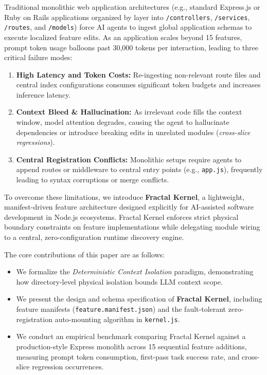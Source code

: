\documentclass[conference]{IEEEtran}
\begin{document}
Traditional monolithic web application architectures (e.g., standard Express.js or Ruby on Rails applications organized by layer into \texttt{/controllers}, \texttt{/services}, \texttt{/routes}, and \texttt{/models}) force AI agents to ingest global application schemas to execute localized feature edits. As an application scales beyond 15 features, prompt token usage balloons past 30,000 tokens per interaction, leading to three critical failure modes:
\begin{enumerate}
    \item \textbf{High Latency and Token Costs:} Re-ingesting non-relevant route files and central index configurations consumes significant token budgets and increases inference latency.
    \item \textbf{Context Bleed \& Hallucination:} As irrelevant code fills the context window, model attention degrades, causing the agent to hallucinate dependencies or introduce breaking edits in unrelated modules (\textit{cross-slice regressions}).
    \item \textbf{Central Registration Conflicts:} Monolithic setups require agents to append routes or middleware to central entry points (e.g., \texttt{app.js}), frequently leading to syntax corruptions or merge conflicts.
\end{enumerate}

To overcome these limitations, we introduce \textbf{Fractal Kernel}, a lightweight, manifest-driven feature architecture designed explicitly for AI-assisted software development in Node.js ecosystems. Fractal Kernel enforces strict physical boundary constraints on feature implementations while delegating module wiring to a central, zero-configuration runtime discovery engine.

The core contributions of this paper are as follows:
\begin{itemize}
    \item We formalize the \textit{Deterministic Context Isolation} paradigm, demonstrating how directory-level physical isolation bounds LLM context scope.
    \item We present the design and schema specification of \textbf{Fractal Kernel}, including feature manifests (\texttt{feature.manifest.json}) and the fault-tolerant zero-registration auto-mounting algorithm in \texttt{kernel.js}.
    \item We conduct an empirical benchmark comparing Fractal Kernel against a production-style Express monolith across 15 sequential feature additions, measuring prompt token consumption, first-pass task success rate, and cross-slice regression occurrences.
\end{itemize}
\end{document}
